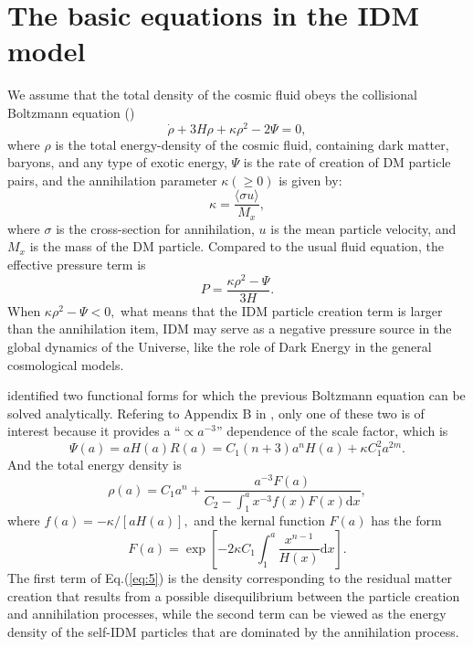 \documentclass[twocolumn]{aastex631}
\begin{document}
\section{The basic equations in the IDM model}

   We assume that the total density of the cosmic fluid obeys
   the collisional Boltzmann equation (\cite{Kolb:1990vq})
   \begin{equation}
      \dot{\rho}+3H\rho+\kappa\rho^2-2\Psi=0,
   \end{equation}
   where $\rho$ is the total energy-density of the cosmic fluid,
   containing dark matter, baryons, and any type of exotic energy,
   $\Psi$ is the rate of creation of DM particle pairs, and the
   annihilation parameter $\kappa(\geq0)$ is given by:
   \begin{equation}
      \kappa=\frac{\langle\sigma u\rangle}{M_x},\label{eq:2}
   \end{equation}
   where $\sigma$ is the cross-section for annihilation, $u$ is
   the mean particle velocity, and $M_x$ is the mass of the DM
   particle.
   Compared to the usual fluid equation, the effective pressure term
   is \begin{equation}
      P=\frac{\kappa\rho^2-\Psi}{3H}.
   \end{equation}
   When $\kappa\rho^2-\Psi<0,$ what means that the IDM particle
   creation term is larger than the annihilation item, IDM may serve
   as a negative pressure source in the global dynamics of the Universe,
   like the role of Dark Energy in the general cosmological models.

   \cite{Basilakos_2009} identified two functional forms for which
   the previous Boltzmann equation can be solved analytically.
   Refering to Appendix B in \cite{Basilakos_2009}, only one of these two is of interest
   because it provides a ``$\propto a^{-3}$'' dependence of the scale factor,
   which is \begin{equation}
      \Psi(a)=aH(a)R(a)=C_1(n+3)a^nH(a)+\kappa C_1^2a^{2m}.
   \end{equation}
   And the total energy density is
   \begin{equation}
      \rho(a)=C_1a^n+\frac{a^{-3}F(a)}{C_2-\int_1^{a}x^{-3}f(x)F(x)\mathrm{d}x},\label{eq:5}
   \end{equation}
   where $f(a)=-\kappa/[aH(a)],$ and the kernal function $F(a)$ has
   the form \begin{equation}
      F(a)=\exp\left[-2\kappa C_1\int_1^{a}\frac{x^{n-1}}{H(x)}\mathrm{d}x\right].
   \end{equation}
   The first term of Eq.(\ref{eq:5}) is the density corresponding to the
   residual matter creation that results from a possible disequilibrium
   between the particle creation and annihilation processes, while the second
   term can be viewed as the energy density of the self-IDM particles that are
   dominated by the annihilation process.
\end{document}
